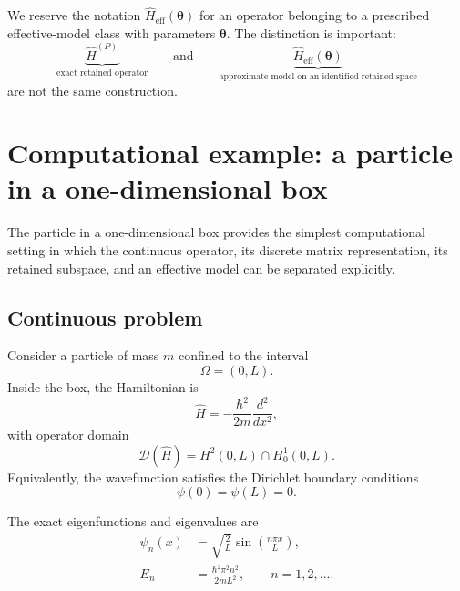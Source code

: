We reserve the notation $\hat H_{\mathrm{eff}}(\boldsymbol\theta)$ for an
operator belonging to a prescribed effective-model class with parameters
$\boldsymbol\theta$. The distinction is important:
\begin{equation}
    \underbrace{\hat H^{(P)}}_{\text{exact retained operator}}
    \qquad\text{and}\qquad
    \underbrace{\hat H_{\mathrm{eff}}(\boldsymbol\theta)}_{
        \text{approximate model on an identified retained space}}
\end{equation}
are not the same construction.

\section{Computational example: a particle in a one-dimensional box}

The particle in a one-dimensional box provides the simplest computational
setting in which the continuous operator, its discrete matrix representation,
its retained subspace, and an effective model can be separated explicitly.

\subsection{Continuous problem}

Consider a particle of mass $m$ confined to the interval
\begin{equation}
    \Omega=(0,L).
\end{equation}
Inside the box, the Hamiltonian is
\begin{equation}
    \hat H
    =
    -\frac{\hbar^2}{2m}\frac{d^2}{dx^2},
\end{equation}
with operator domain
\begin{equation}
    \mathcal D(\hat H)
    =
    H^2(0,L)\cap H_0^1(0,L).
\end{equation}
Equivalently, the wavefunction satisfies the Dirichlet boundary conditions
\begin{equation}
    \psi(0)=\psi(L)=0.
\end{equation}

The exact eigenfunctions and eigenvalues are
\begin{align}
    \psi_n(x)
    &=
    \sqrt{\frac{2}{L}}
    \sin\left(\frac{n\pi x}{L}\right),
    \\
    E_n
    &=
    \frac{\hbar^2\pi^2n^2}{2mL^2},
    \qquad n=1,2,\ldots.
\end{align}

